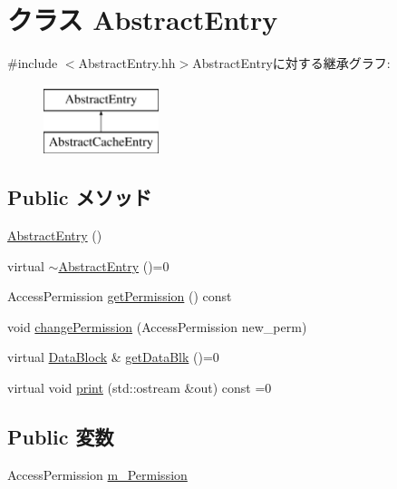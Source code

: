 \hypertarget{classAbstractEntry}{
\section{クラス AbstractEntry}
\label{classAbstractEntry}
}


{\ttfamily \#include $<$AbstractEntry.hh$>$}AbstractEntryに対する継承グラフ:\begin{figure}[H]
\begin{center}
\leavevmode
\includegraphics[height=2cm]{classAbstractEntry}
\end{center}
\end{figure}
\subsection*{Public メソッド}
\begin{DoxyCompactItemize}
\item 
\hyperlink{classAbstractEntry_ad75be01d4fce1bd2ce3e7eb247ba40a3}{AbstractEntry} ()
\item 
virtual \hyperlink{classAbstractEntry_aa17a28f91e67d9936834d333e9c29524}{$\sim$AbstractEntry} ()=0
\item 
AccessPermission \hyperlink{classAbstractEntry_aaa8d971d0265aff3209ae487837576f7}{getPermission} () const 
\item 
void \hyperlink{classAbstractEntry_ac3f081af818286da737aac954875dd19}{changePermission} (AccessPermission new\_\-perm)
\item 
virtual \hyperlink{classDataBlock}{DataBlock} \& \hyperlink{classAbstractEntry_afec4a5462c59a6427dd945c8e57d892f}{getDataBlk} ()=0
\item 
virtual void \hyperlink{classAbstractEntry_a3ea5f7af5db62cc24f4e40df9ea5c971}{print} (std::ostream \&out) const =0
\end{DoxyCompactItemize}
\subsection*{Public 変数}
\begin{DoxyCompactItemize}
\item 
AccessPermission \hyperlink{classAbstractEntry_adffb6e818a8b13110daeb2c3c13fcc50}{m\_\-Permission}
\end{DoxyCompactItemize}


